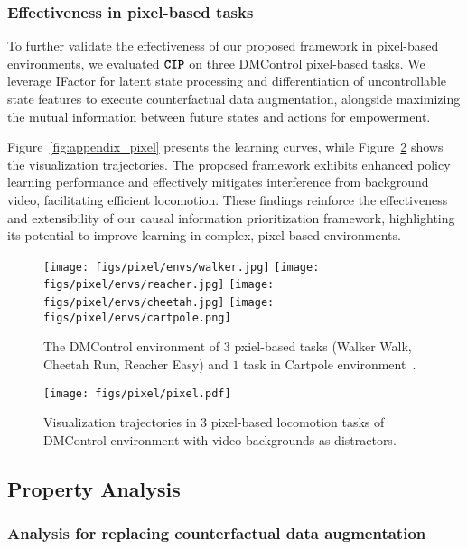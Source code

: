 \subsubsection{Effectiveness in pixel-based tasks}
\label{sec:vis_pixel}
To further validate the effectiveness of our proposed framework in pixel-based environments, we evaluated $\texttt{\textbf{CIP}}$ on three DMControl pixel-based tasks. We leverage IFactor for latent state processing and differentiation of uncontrollable state features to execute counterfactual data augmentation, alongside maximizing the mutual information between future states and actions for empowerment. 

Figure~\ref{fig:appendix_pixel} presents the learning curves, while Figure~\ref{fig:appendix_pixel_vis} shows the visualization trajectories. The proposed framework exhibits enhanced policy learning performance and effectively mitigates interference from background video, facilitating efficient locomotion. These findings reinforce the effectiveness and extensibility of our causal information prioritization framework, highlighting its potential to improve learning in complex, pixel-based environments. 

\begin{figure}[t]
    \centering
    \texttt{[image: figs/pixel/envs/walker.jpg]}
    \texttt{[image: figs/pixel/envs/reacher.jpg]}
    \texttt{[image: figs/pixel/envs/cheetah.jpg]}
    \texttt{[image: figs/pixel/envs/cartpole.png]}
    \caption{The DMControl environment of $3$ pxiel-based tasks (Walker Walk, Cheetah Run, Reacher Easy) and $1$ task in Cartpole environment~\citep{liu2024learning}.}
    \label{fig:appendix_pixel_env}
\end{figure}


\begin{figure}[t]
    \centering
    \texttt{[image: figs/pixel/pixel.pdf]}
    \caption{Visualization trajectories in $3$ pixel-based locomotion tasks of DMControl environment with video backgrounds as distractors.}
    \label{fig:appendix_pixel_vis}
\end{figure}


\subsection{Property Analysis}
\label{sec:pro_res_appendix}

\subsubsection{Analysis for replacing counterfactual data augmentation}
\label{sec:appendix_cda_replace}


